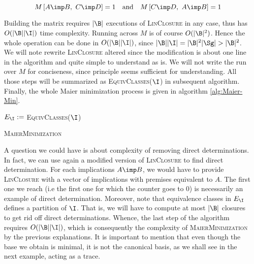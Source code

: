 \[ M\left[A \imp B, \ C \imp D \right] = 1 \quad \text{and} \quad 
M\left[C \imp D, \ A \imp B \right] = 1 \]

\noindent Building the matrix requires $|\B|$ executions of \textsc{LinClosure}
in any case, thus has $O(|\B||\I|)$ time complexity. Running across $M$ is 
of course $O(|\B|^2)$. Hence the whole operation can be done in $O(|\B||\I|)$,
since $|\B||\I| = |\B|^2|\Sg| > |\B|^2$. We will note rewrite 
\textsc{LinClosure} altered since the modification is about one line in the 
algorithm and quite simple to understand as is. We will not write the run over 
$M$ for conciseness, since principle seems sufficient for understanding. All 
those steps will be summarized as \textsc{EquivClasses}($\I$) in subsequent 
algorithm. Finally, the whole Maier minimization process is given in algorithm
\ref{alg:Maier-Min}.

\vspace{1.2em}

\begin{algorithm}
	
	\BlankLine
	\BlankLine
	
	
	\BlankLine
	
	$E_{\I} := $ \textsc{EquivClasses}($\I$) \;
	
	\BlankLine
	
	
	\caption{\textsc{MaierMinimization}}
	\label{alg:Maier-Min}
\end{algorithm}

A question we could have is about complexity of removing direct determinations.
In fact, we can use again a modified version of \textsc{LinClosure} to find
direct determination. For each implications $A \imp B$, we would have to 
provide \textsc{LinClosure} with a vector of implications with premises 
equivalent to $A$. The first one we reach (i.e the first one for which the 
counter goes to 0) is necessarily an example of direct determination. Moreover,
note that equivalence classes in $E_{\I}$ defines a partition of $\I$. That is,
we will have to compute at most $|\B|$ closures to get rid off direct 
determinations. Whence, the last step of the algorithm requires $O(|\B||\I|)$,
which is consequently the complexity of \textsc{MaierMinimization} by the 
previous explanations. It is important to mention that even though the base
we obtain is minimal, it is not the canonical basis, as we shall see in the
next example, acting as a trace.

